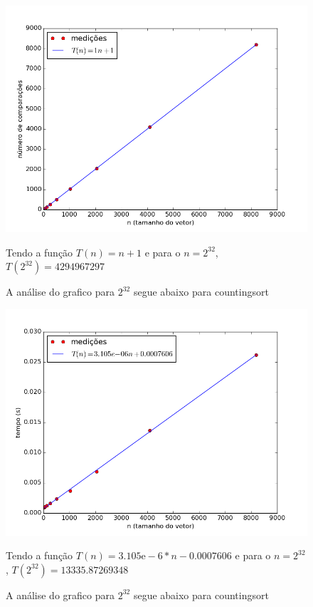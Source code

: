\documentclass[12pt,a4paper,twoside]{report}
\begin{document}
\begin{figure}[ht]
\centering \includegraphics[scale=0.8]{../countingsort/imagens/countingsortQuaseCresc501.png}
\caption{A análise do grafico para $2^{32}$ segue abaixo para countingsort}

Tendo a função $T(n) = n+1$ e para o $n =2^{32}$, $T(2^{32}) = 4294967297$ 
\label{fig:countingsortQuaseCresc501}
\end{figure}




\begin{figure}[ht]
\centering \includegraphics[scale=0.8]{../countingsort/imagens/countingsortQuaseDecresc100.png}
\caption{A análise do grafico para $2^{32}$ segue abaixo para countingsort}

Tendo a função $T(n) = 3.105\mathrm{e}-6*n-0.0007606$ e para o $n =2^{32}$, $T(2^{32}) = 13335.87269348$ 
\label{fig:countingsortQuaseDecresc100}
\end{figure}
\end{document}
